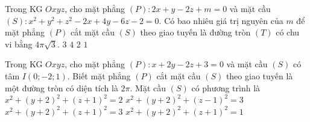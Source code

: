 \begin{ex}%
	Trong KG $Oxyz$, cho mặt phẳng $(P):2x+y-2z+m=0$ và mặt cầu $(S):x^2+y^2+z^2-2x+4y-6z-2=0$. Có bao nhiêu giá trị nguyên của  $m$ để mặt phẳng $(P)$ cắt mặt cầu $(S)$ theo giao tuyến là đường tròn $(T)$ có chu vi bằng $4\pi \sqrt{3}$. 
	\choice
	{$3$}
	{$4$}
	{\True $2$}
	{$1$}
\end{ex}
\begin{ex}%
	Trong KG $Oxyz$, cho mặt phẳng $(P)\colon x+2y-2z+3=0$ và mặt cầu $(S)$ có tâm $I(0;-2;1)$. Biết mặt phẳng $(P)$ cắt mặt cầu $(S)$ theo giao tuyến là một đường tròn có diện tích là $2\pi $. Mặt cầu $(S)$ có phương trình là
	\choice
	{$x^2+(y+2)^2+(z+1)^2=2$}
	{\True $x^2+(y+2)^2+(z-1)^2=3$}
	{$x^2+(y+2)^2+(z+1)^2=3$}
	{$x^2+(y+2)^2+(z+1)^2=1$}
\end{ex}
